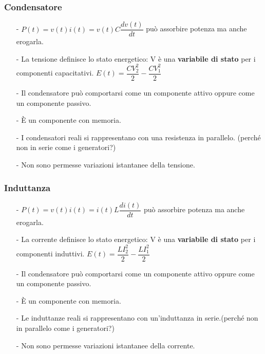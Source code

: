 \documentclass{article}
\begin{document}
\subsubsection{Condensatore}
\medskip
\noindent{}
\begin{itemize}
    \item[-] $P(t)=v(t)i(t)=v(t)C\dfrac{d v(t)}{d t}$ può assorbire potenza ma anche erogarla.
    \item[-] La tensione definisce lo stato energetico: V è una \textbf{variabile di stato} per i componenti capacitativi. $E(t)=\dfrac{CV_2^2}{2} - \dfrac{CV_1^2}{2}$
    \item[-] Il condensatore può comportarsi come un componente attivo oppure come un componente passivo.
    \item[-] È un componente con memoria. 
    \item[-] I condensatori reali si rappresentano con una resistenza in parallelo. (perché non in serie come i generatori?)
    \item[-] Non sono permesse variazioni istantanee della tensione. 
\end{itemize}


\subsubsection{Induttanza}
\medskip
\noindent{}
\begin{itemize}
    \item[-] $P(t)=v(t)i(t)=i(t)L\dfrac{d i(t)}{d t}$ può assorbire potenza ma anche erogarla.
    \item[-] La corrente definisce lo stato energetico: V è una \textbf{variabile di stato} per i componenti induttivi. 
    $E(t)=\dfrac{LI_2^2}{2} - \dfrac{LI_1^2}{2}$
    \item[-] Il condensatore può comportarsi come un componente attivo oppure come un componente passivo.
    \item[-] È un componente con memoria. 
    \item[-] Le induttanze reali si rappresentano con un'induttanza in serie.(perché non in parallelo come i generatori?)
    \item[-] Non sono permesse variazioni istantanee della corrente.
\end{itemize}
\end{document}

